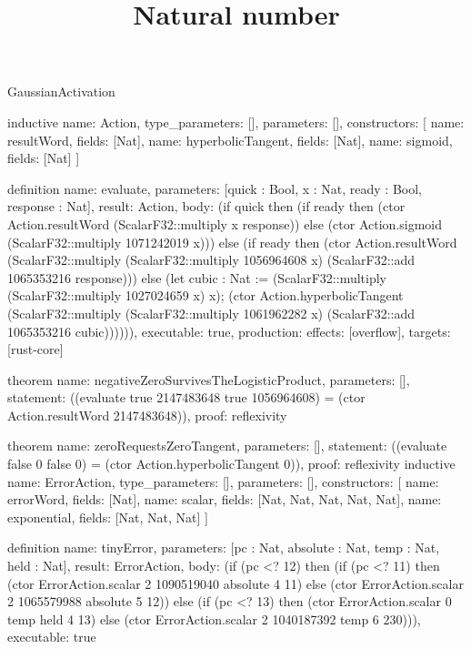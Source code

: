 \begin{lexlean}{GaussianActivation}
\title{Natural number}
\begin{semanticmodule}
inductive{
  name: Action,
  type_parameters: [],
  parameters: [],
  constructors: [
    {name: resultWord, fields: [Nat]},
    {name: hyperbolicTangent, fields: [Nat]},
    {name: sigmoid, fields: [Nat]}
  ]
}

definition{
  name: evaluate,
  parameters: [quick : Bool, x : Nat, ready : Bool, response : Nat],
  result: Action,
  body: (if quick then (if ready then (ctor Action.resultWord (ScalarF32::multiply x response)) else (ctor Action.sigmoid (ScalarF32::multiply 1071242019 x))) else (if ready then (ctor Action.resultWord (ScalarF32::multiply (ScalarF32::multiply 1056964608 x) (ScalarF32::add 1065353216 response))) else (let cubic : Nat := (ScalarF32::multiply (ScalarF32::multiply 1027024659 x) x); (ctor Action.hyperbolicTangent (ScalarF32::multiply (ScalarF32::multiply 1061962282 x) (ScalarF32::add 1065353216 cubic)))))),
  executable: true,
  production: {effects: [overflow], targets: [rust-core]}
}

theorem{
  name: negativeZeroSurvivesTheLogisticProduct,
  parameters: [],
  statement: ((evaluate true 2147483648 true 1056964608) = (ctor Action.resultWord 2147483648)),
  proof: reflexivity{}
}

theorem{
  name: zeroRequestsZeroTangent,
  parameters: [],
  statement: ((evaluate false 0 false 0) = (ctor Action.hyperbolicTangent 0)),
  proof: reflexivity{}
}
inductive{
  name: ErrorAction,
  type_parameters: [],
  parameters: [],
  constructors: [
    {name: errorWord, fields: [Nat]},
    {name: scalar, fields: [Nat, Nat, Nat, Nat, Nat]},
    {name: exponential, fields: [Nat, Nat, Nat]}
  ]
}

definition{
  name: tinyError,
  parameters: [pc : Nat, absolute : Nat, temp : Nat, held : Nat],
  result: ErrorAction,
  body: (if (pc <? 12) then (if (pc <? 11) then (ctor ErrorAction.scalar 2 1090519040 absolute 4 11) else (ctor ErrorAction.scalar 2 1065579988 absolute 5 12)) else (if (pc <? 13) then (ctor ErrorAction.scalar 0 temp held 4 13) else (ctor ErrorAction.scalar 2 1040187392 temp 6 230))),
  executable: true
}


\end{semanticmodule}
\end{lexlean}
